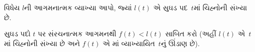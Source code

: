\begin{prob}
  વિધેય $l$ની આગમનાત્મક વ્યાખ્યા આપો, જ્યાં
  $l(t)$ એ સુઘડ પદ~$t$માં ચિહ્નોની સંખ્યા છે.
\end{prob}

\begin{prob}
  સુઘડ પદો $t$ પર સંરચનાત્મક આગમનથી
  $f(t) < l(t)$ સાબિત કરો (અહીં $l(t)$
  એ~$t$માં ચિહ્નોની સંખ્યા છે અને $f(t)$
  એ માં
  વ્યાખ્યાયિત~$t$નું ઊંડાણ છે).
\end{prob}
\endgroup


\OLEndChapterHook
\endgroup


\OLEndPartHook
